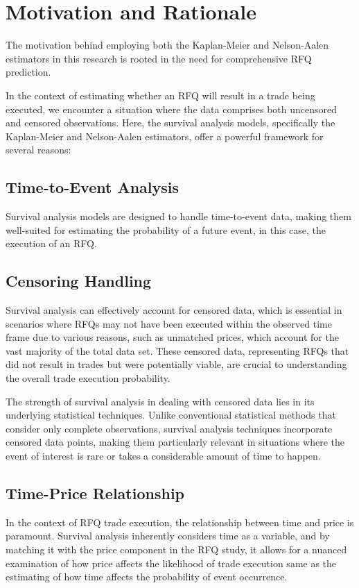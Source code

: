 \section{Motivation and Rationale}
The motivation behind employing both the Kaplan-Meier and Nelson-Aalen estimators in this research is rooted in the need for comprehensive RFQ prediction.

In the context of estimating whether an RFQ will result in a trade being executed, we encounter a situation where the data comprises both uncensored and censored observations. Here, the survival analysis models, specifically the Kaplan-Meier and Nelson-Aalen estimators, offer a powerful framework for several reasons:

\subsection{Time-to-Event Analysis}
Survival analysis models are designed to handle time-to-event data, making them well-suited for estimating the probability of a future event, in this case, the execution of an RFQ.

\subsection{Censoring Handling}
Survival analysis can effectively account for censored data, which is essential in scenarios where RFQs may not have been executed within the observed time frame due to various reasons, such as unmatched prices, which account for the vast majority of the total data set. These censored data, representing RFQs that did not result in trades but were potentially viable, are crucial to understanding the overall trade execution probability.

The strength of survival analysis in dealing with censored data lies in its underlying statistical techniques. Unlike conventional statistical methods that consider only complete observations, survival analysis techniques incorporate censored data points, making them particularly relevant in situations where the event of interest is rare or takes a considerable amount of time to happen.

\subsection{Time-Price Relationship}
In the context of RFQ trade execution, the relationship between time and price is paramount. Survival analysis inherently considers time as a variable, and by matching it with the price component in the RFQ study, it allows for a nuanced examination of how price affects the likelihood of trade execution same as the estimating of how time affects the probability of event occurrence.

